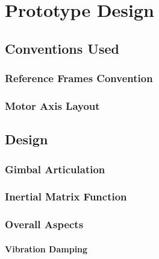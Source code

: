 \chapter{Prototype Design}
\label{ch:design}
\section{Conventions Used}
\label{sec:design.conventions}
\subsection{Reference Frames Convention}
\label{subsec:ch2.conventions.refframes}
\subsection{Motor Axis Layout}
\label{subsec:ch2.conventions.motoraxis}

\section{Design}
\label{sec:ch2.design}
\subsection{Gimbal Articulation}
\label{subsec:ch2.design.articulation}
\subsection{Inertial Matrix Function}
\label{subsec:ch2.design.inertial}
\subsection{Overall Aspects}
\label{subsec:ch2.design.aspects}
\subsubsection{Vibration Damping}
